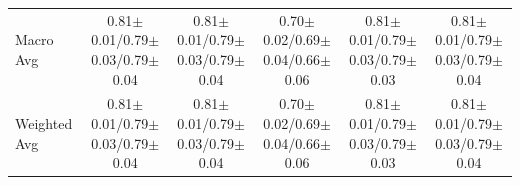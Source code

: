 \documentclass[10pt,a4paper,parskip=half-]{scrartcl}
\begin{document}
\begin{landscape}
\begin{table}[H]
{\begin{tabular}{l|cccc|cccc|cccc|cccc|cccc}
Macro Avg & \multicolumn{4}{c|}{0.81$\pm$0.01/0.79$\pm$0.03/0.79$\pm$0.04} & \multicolumn{4}{c|}{0.81$\pm$0.01/0.79$\pm$0.03/0.79$\pm$0.04} & \multicolumn{4}{c|}{0.70$\pm$0.02/0.69$\pm$0.04/0.66$\pm$0.06} & \multicolumn{4}{c|}{0.81$\pm$0.01/0.79$\pm$0.03/0.79$\pm$0.03} & \multicolumn{4}{c}{0.81$\pm$0.01/0.79$\pm$0.03/0.79$\pm$0.04} \\
Weighted Avg & \multicolumn{4}{c|}{0.81$\pm$0.01/0.79$\pm$0.03/0.79$\pm$0.04} & \multicolumn{4}{c|}{0.81$\pm$0.01/0.79$\pm$0.03/0.79$\pm$0.04} & \multicolumn{4}{c|}{0.70$\pm$0.02/0.69$\pm$0.04/0.66$\pm$0.06} & \multicolumn{4}{c|}{0.81$\pm$0.01/0.79$\pm$0.03/0.79$\pm$0.03} & \multicolumn{4}{c}{0.81$\pm$0.01/0.79$\pm$0.03/0.79$\pm$0.04} \\
\bottomrule
\end{tabular}}
\end{table}


\end{landscape}
\end{document}
